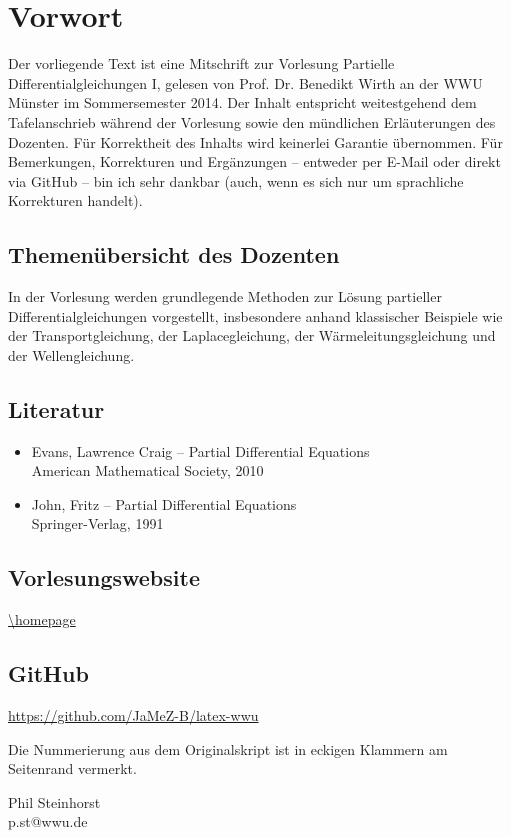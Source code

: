 \section*{Vorwort}
\label{sec:preface}
	Der vorliegende Text ist eine Mitschrift zur Vorlesung Partielle Differentialgleichungen I, gelesen von Prof. Dr. Benedikt Wirth an der WWU Münster im Sommersemester 2014. Der Inhalt entspricht weitestgehend dem Tafelanschrieb während der Vorlesung sowie den mündlichen Erläuterungen des Dozenten. Für Korrektheit des Inhalts wird keinerlei Garantie übernommen. Für Bemerkungen, Korrekturen und Ergänzungen -- entweder per E-Mail oder direkt via GitHub -- bin ich sehr dankbar (auch, wenn es sich nur um	sprachliche Korrekturen handelt). \\
	
\subsection*{Themenübersicht des Dozenten}
\label{sub:content}
	In der Vorlesung werden grundlegende Methoden zur Lösung partieller Differentialgleichungen vorgestellt, insbesondere anhand klassischer Beispiele wie der Transportgleichung, der Laplacegleichung, der Wärmeleitungsgleichung und der Wellengleichung.
	
\subsection*{Literatur}
\label{sub:lit}
	\begin{itemize}
		\item Evans, Lawrence Craig -- Partial Differential Equations \\
		American Mathematical Society, 2010
		\item John, Fritz -- Partial Differential Equations \\
		Springer-Verlag, 1991
	\end{itemize}
	
\subsection*{Vorlesungswebsite}
\label{sub:link}
\begin{center}
	\url{\homepage}
\end{center}

\subsection*{GitHub}
\label{sub:git}
\begin{center}
	\url{https://github.com/JaMeZ-B/latex-wwu}
\end{center}


Die Nummerierung aus dem Originalskript ist in eckigen Klammern am Seitenrand vermerkt.

\vfill
\begin{flushright}
Phil Steinhorst \\
p.st@wwu.de
\end{flushright}
\newpage
